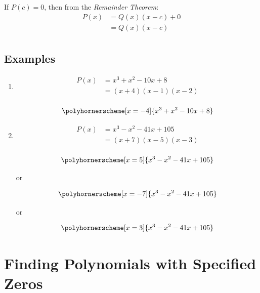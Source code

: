 \documentclass{exam}
\begin{document}
  If $P(c) = 0$, then from the {\em Remainder Theorem}:
  \begin{align*}
    P(x) &= Q(x)(x - c) + 0 \\
         &= Q(x)(x - c) \\
  \end{align*}

  \subsection{Examples}
  \begin{enumerate}

    \item 
      \begin{align*}
        P(x) &= x^3 + x^2 - 10x + 8 \\
             &= (x + 4)(x - 1)(x - 2) \\
      \end{align*}

      \[ \polyhornerscheme[x = -4]{x^3 + x^2 - 10x + 8} \]

    \item 
      \begin{align*}
        P(x) &= x^3 - x^2 - 41x + 105 \\
             &= (x + 7)(x - 5)(x - 3) \\
      \end{align*}

      \[ \polyhornerscheme[x = 5]{x^3 - x^2 - 41x + 105} \]

      or

      \[ \polyhornerscheme[x = -7]{x^3 - x^2 - 41x + 105} \]

      or

      \[ \polyhornerscheme[x = 3]{x^3 - x^2 - 41x + 105} \]

  \end{enumerate}

  \pagebreak

  \section{Finding Polynomials with Specified Zeros}
\end{document}
